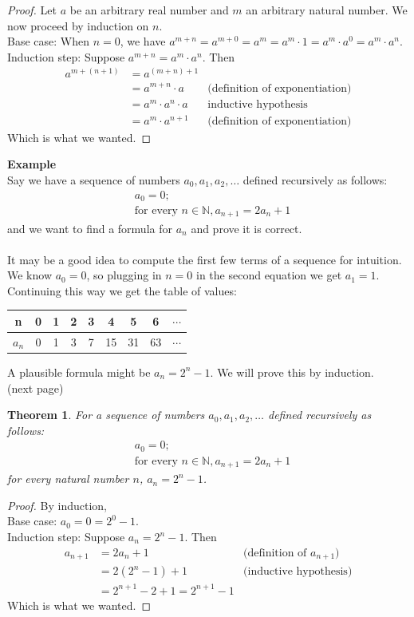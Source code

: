 \documentclass{report}
\newtheorem*{theorem}{Theorem}
\theoremstyle{definition}
\begin{document}
\begin{proof}
Let $a$ be an arbitrary real number and $m$ an arbitrary natural number. We now proceed by induction on $n$.\\
\indent Base case: When $n=0$, we have $a^{m+n}=a^{m+0}=a^m=a^m\cdot1=a^m\cdot a^0=a^m\cdot a^n$.\\
\indent Induction step: Suppose $a^{m+n}=a^m\cdot a^n$. Then 
\begin{align*}
a^{m+(n+1)}&=a^{(m+n)+1}\\
&=a^{m+n}\cdot a&\text{(definition of exponentiation)}\\
&=a^m\cdot a^n\cdot a&\text{inductive hypothesis}\\
&=a^m\cdot a^{n+1}&\text{(definition of exponentiation)}
\end{align*}
Which is what we wanted.
\end{proof}
\noindent\textbf{Example}\\
Say we have a sequence of numbers $a_0,a_1,a_2,\ldots$ defined recursively as follows:
\begin{align*}
&a_0=0;\\
&\text{for every }n\in\mathbb N,a_{n+1}=2a_n+1
\end{align*}
and we want to find a formula for $a_n$ and prove it is correct.\\
\vspace{1mm}\\
It may be a good idea to compute the first few terms of a sequence for intuition. We know $a_0=0$, so plugging in $n=0$ in the second equation we get $a_1=1$. Continuing this way we get the
table of values:
\begin{center}
\begin{tabular}{c|cccccccc}
n&0&1&2&3&4&5&6&$\cdots$\\
\hline
$a_n$&0&1&3&7&15&31&63&$\cdots$
\end{tabular}
\end{center}
A plausible formula might be $a_n=2^n-1$. We will prove this by induction.\\
(next page)\newpage
\begin{theorem}
For a sequence of numbers $a_0,a_1,a_2,\ldots$ defined recursively as follows:
\begin{align*}
&a_0=0;\\
&\text{for every }n\in\mathbb N,a_{n+1}=2a_n+1
\end{align*}
for every natural number $n$, $a_n=2^n-1$.
\end{theorem}
\begin{proof}
By induction,\\
\indent Base case: $a_0=0=2^0-1$.\\
\indent Induction step: Suppose $a_n=2^n-1$. Then
\begin{align*}
a_{n+1}&=2a_n+1&\text{(definition of $a_{n+1}$)}\\
&=2(2^n-1)+1&\text{(inductive hypothesis)}\\
&=2^{n+1}-2+1=2^{n+1}-1
\end{align*}
Which is what we wanted.
\end{proof}
\end{document}
